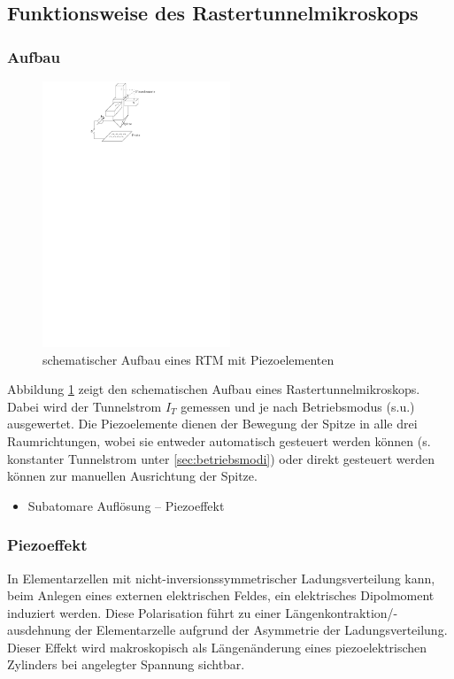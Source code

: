 \documentclass[10pt, a4paper]{article}
\begin{document}
\subsection{Funktionsweise des Rastertunnelmikroskops}
\subsubsection{Aufbau}
\begin{figure}[h]
\centering
\includegraphics[width=0.5\textwidth]{./grafiken/rtm_aufbau.pdf}
\caption{schematischer Aufbau eines RTM mit Piezoelementen}
\label{fig:aufbau}
\end{figure}
Abbildung \ref{fig:aufbau} zeigt den schematischen Aufbau eines Rastertunnelmikroskops.
Dabei wird der Tunnelstrom $I_T$ gemessen und je nach Betriebsmodus (s.u.)  ausgewertet.
Die Piezoelemente dienen der Bewegung der Spitze in alle drei Raumrichtungen, wobei sie entweder automatisch gesteuert werden können (s. konstanter Tunnelstrom unter \ref{sec:betriebsmodi}) oder direkt gesteuert werden können zur manuellen Ausrichtung der Spitze.
\begin{itemize}
  \item Subatomare Auflösung -- Piezoeffekt
\end{itemize}
\subsubsection{Piezoeffekt}
In Elementarzellen mit nicht-inversionssymmetrischer Ladungsverteilung kann, beim Anlegen eines externen elektrischen Feldes, ein elektrisches Dipolmoment induziert werden.
Diese Polarisation führt zu einer Längenkontraktion/-ausdehnung der Elementarzelle aufgrund der Asymmetrie der Ladungsverteilung.
Dieser Effekt wird makroskopisch als Längenänderung eines piezoelektrischen Zylinders bei angelegter Spannung sichtbar.
\end{document}
